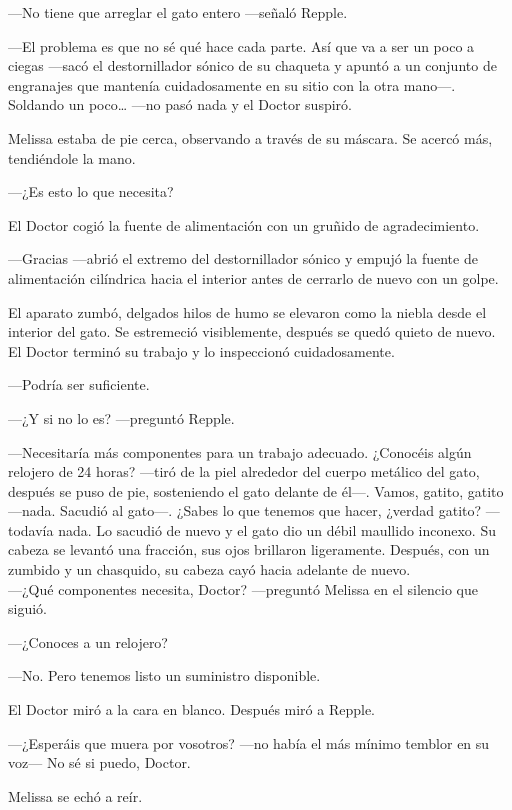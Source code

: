 {---No tiene que arreglar el gato entero ---señaló Repple.}

{---El problema es que no sé qué hace cada parte. Así que va a ser
	un poco a ciegas ---sacó el destornillador sónico de su chaqueta y
	apuntó a un conjunto de engranajes que mantenía cuidadosamente en su
	sitio con la otra mano---. Soldando un poco\ldots{} ---no pasó nada
y el Doctor suspiró.}

{Melissa estaba de pie cerca, observando a través de su máscara. Se
acercó más, tendiéndole la mano.}

{---¿Es esto lo que necesita?}

{El Doctor cogió la fuente de alimentación con un gruñido de
agradecimiento.}

{---Gracias ---abrió el extremo del destornillador sónico y empujó la
	fuente de alimentación cilíndrica hacia el interior antes de cerrarlo de
nuevo con un golpe.}

{El aparato zumbó, delgados hilos de humo se elevaron como la niebla
	desde el interior del gato. Se estremeció visiblemente, después se
	quedó quieto de nuevo. El Doctor terminó su trabajo y lo inspeccionó
cuidadosamente.}

{---Podría ser suficiente.}

{---¿Y si no lo es? ---preguntó Repple.}

{---Necesitaría más componentes para un trabajo adecuado. ¿Conocéis
	algún relojero de 24 horas? ---tiró de la piel alrededor del cuerpo
	metálico del gato, después se puso de pie, sosteniendo el gato delante
	de él---. Vamos, gatito, gatito ---nada. Sacudió al
	gato---. ¿Sabes lo que tenemos que hacer, ¿verdad gatito? ---todavía
	nada. Lo sacudió de nuevo y el gato dio un débil maullido
	inconexo. Su cabeza se levantó una fracción, sus ojos brillaron
	ligeramente. Después, con un zumbido y un chasquido, su cabeza cayó
	hacia adelante de nuevo.\\
	---¿Qué componentes necesita, Doctor? ---preguntó Melissa en el silencio
que siguió.}

{---¿Conoces a un relojero?}

{---No. Pero tenemos listo un suministro disponible.}

{El Doctor miró a la cara en blanco. Después miró a Repple.}

{---¿Esperáis que muera por vosotros? ---no había el más mínimo temblor
en su voz--- No sé si puedo, Doctor.}

{Melissa se echó a reír.}

